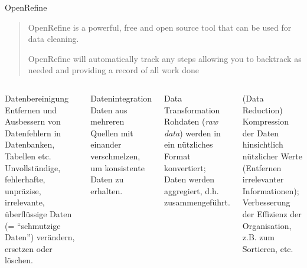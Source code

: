 \begin{frame}{OpenRefine}
    \begin{quote}
        OpenRefine is a powerful, free and open source tool that can be used for data cleaning.
        
        OpenRefine will automatically track any steps allowing you to backtrack as needed and providing a record of all work done
    \end{quote}
  \begin{columns}[T,onlytextwidth]


      \begin{block}{Datenbereinigung}\footnotesize 
Entfernen und Ausbessern von Datenfehlern in Datenbanken, Tabellen etc. 
Unvollständige, fehlerhafte, unpräzise, irrelevante, überflüssige Daten (= “schmutzige Daten”) verändern, ersetzen oder löschen. 
      \end{block}

      \begin{block}{Datenintegration}\footnotesize 
Daten aus mehreren Quellen mit einander verschmelzen,
um konsistente Daten zu erhalten. 
      \end{block}


      \begin{block}{Data Transformation}\footnotesize 
      Rohdaten (\emph{raw data}) werden in ein nützliches Format konvertiert; Daten werden aggregiert, d.h. zusammengeführt. 
      \end{block}
      
      \begin{block}{(Data Reduction)}\footnotesize 
      Kompression der Daten hinsichtlich nützlicher Werte (Entfernen irrelevanter Informationen); Verbesserung der Effizienz der Organisation, z.B. zum Sortieren, etc.
      \end{block}
      
  \end{columns}
\end{frame}

